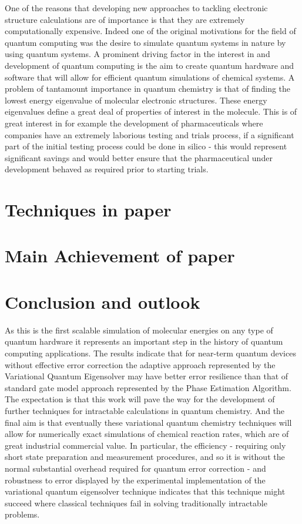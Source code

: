 \documentclass[12pt]{article}
\begin{document}
One of the reasons that developing new approaches to tackling electronic structure calculations are of importance is that they are extremely computationally expensive. Indeed one of the original motivations for the field of quantum computing was the desire to simulate quantum systems in nature by using quantum systems. A prominent driving factor in the interest in and development of quantum computing is the aim to create quantum hardware and software that will allow for efficient quantum simulations of chemical systems. A problem of tantamount importance in quantum chemistry is that of finding the lowest energy eigenvalue of molecular electronic structures. These energy eigenvalues define a great deal of properties of interest in the molecule. This is of great interest in for example the development of pharmaceuticals where companies have an extremely laborious testing and trials process, if a significant part of the initial testing process could be done in silico - this would represent significant savings and would better ensure that the pharmaceutical under development behaved as required prior to starting trials.
\section{Techniques in paper}
\cite{ryabinkin2018constrained}
\section{Main Achievement of paper}
\section{Conclusion and outlook}
As this is the first scalable simulation of molecular energies on any type of quantum hardware it represents an important step in the history of quantum computing applications. The results indicate that for near-term quantum devices without effective error correction the adaptive approach represented by the Variational Quantum Eigensolver may have better error resilience than that of standard gate model approach represented by the Phase Estimation Algorithm. The expectation is that this work will pave the way for the development of further techniques for intractable calculations in quantum chemistry. And the final aim is that eventually these variational quantum chemistry techniques will allow for numerically exact simulations of chemical reaction rates, which are of great industrial commercial value. In particular, the efficiency - requiring only short state preparation and measurement procedures, and so it is without the normal substantial overhead required for quantum error correction - and robustness to error displayed by the experimental implementation of the variational quantum eigensolver technique indicates that this technique might succeed where classical techniques fail in solving traditionally intractable problems. 
\end{document}
